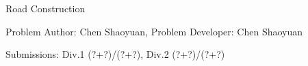 \begin{Solution}{Road Construction}

\begin{frame}{\ProblemName}

\small Problem Author: Chen Shaoyuan, Problem Developer: Chen Shaoyuan \par \vspace{0.3cm}

\small Submissions: Div.1 (?+?)/(?+?), Div.2 (?+?)/(?+?)  \par \vspace{0.5cm}


\end{frame}

\end{Solution}
